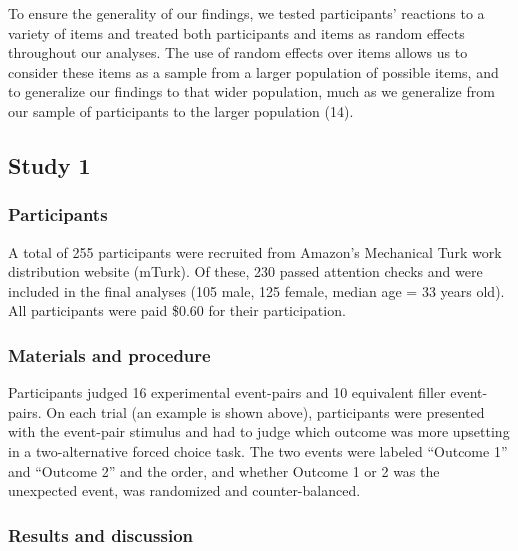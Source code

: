 \documentclass[9pt,twocolumn,twoside,]{pnas-new}
\begin{document}
{To ensure the generality of our findings, we tested participants'
reactions to a variety of items and treated both participants and items
as random effects throughout our analyses. The use of random effects
over items allows us to consider these items as a sample from a larger
population of possible items, and to generalize our findings to that
wider population, much as we generalize from our sample of participants
to the larger population (14).

\subsection*{Study 1}\label{study1}

\subsubsection*{Participants}\label{s1-participants}

A total of 255 participants were recruited from Amazon's Mechanical Turk
work distribution website (mTurk). Of these, 230 passed attention checks
and were included in the final analyses (105 male, 125 female, median
age = 33 years old). All participants were paid \$0.60 for their
participation.

\subsubsection*{Materials and procedure}\label{s1-materials-procedure}

Participants judged 16 experimental event-pairs and 10 equivalent filler
event-pairs. On each trial (an example is shown above), participants
were presented with the event-pair stimulus and had to judge which
outcome was more upsetting in a two-alternative forced choice task. The
two events were labeled ``Outcome 1'' and ``Outcome 2'' and the order,
and whether Outcome 1 or 2 was the unexpected event, was randomized and
counter-balanced.

\subsubsection*{Results and discussion}\label{s1-results}

}
\end{document}
